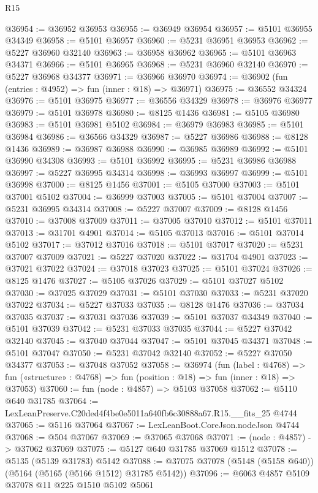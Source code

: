 \begin{lexlean}{R15}
\begin{coremodule}
{{{{{{{{{{{@36954 := @36952 @36953
@36955 := @36949 @36954
@36957 := @5101 @36955 @34349
@36958 := @5101 @36957
@36960 := @5231 @36951 @36953
@36962 := @5227 @36960 @32140
@36963 := @36958 @36962
@36965 := @5101 @36963 @34371
@36966 := @5101 @36965
@36968 := @5231 @36960 @32140
@36970 := @5227 @36968 @34377
@36971 := @36966 @36970
@36974 := @36902 (fun (entries : @4952) => fun (inner : @18) => @36971)
@36975 := @36552 @34324
@36976 := @5101 @36975
@36977 := @36556 @34329
@36978 := @36976 @36977
@36979 := @5101 @36978
@36980 := @8125 @1436
@36981 := @5105 @36980
@36983 := @5101 @36981 @5102
@36984 := @36979 @36983
@36985 := @5101 @36984
@36986 := @36566 @34329
@36987 := @5227 @36986
@36988 := @8128 @1436
@36989 := @36987 @36988
@36990 := @36985 @36989
@36992 := @5101 @36990 @34308
@36993 := @5101 @36992
@36995 := @5231 @36986 @36988
@36997 := @5227 @36995 @34314
@36998 := @36993 @36997
@36999 := @5101 @36998
@37000 := @8125 @1456
@37001 := @5105 @37000
@37003 := @5101 @37001 @5102
@37004 := @36999 @37003
@37005 := @5101 @37004
@37007 := @5231 @36995 @34314
@37008 := @5227 @37007
@37009 := @8128 @1456
@37010 := @37008 @37009
@37011 := @37005 @37010
@37012 := @5101 @37011
@37013 := @31701 @4901
@37014 := @5105 @37013
@37016 := @5101 @37014 @5102
@37017 := @37012 @37016
@37018 := @5101 @37017
@37020 := @5231 @37007 @37009
@37021 := @5227 @37020
@37022 := @31704 @4901
@37023 := @37021 @37022
@37024 := @37018 @37023
@37025 := @5101 @37024
@37026 := @8125 @1476
@37027 := @5105 @37026
@37029 := @5101 @37027 @5102
@37030 := @37025 @37029
@37031 := @5101 @37030
@37033 := @5231 @37020 @37022
@37034 := @5227 @37033
@37035 := @8128 @1476
@37036 := @37034 @37035
@37037 := @37031 @37036
@37039 := @5101 @37037 @34349
@37040 := @5101 @37039
@37042 := @5231 @37033 @37035
@37044 := @5227 @37042 @32140
@37045 := @37040 @37044
@37047 := @5101 @37045 @34371
@37048 := @5101 @37047
@37050 := @5231 @37042 @32140
@37052 := @5227 @37050 @34377
@37053 := @37048 @37052
@37058 := @36974
    (fun (label : @4768) =>
    fun («structure» : @4768) => fun (position : @18) => fun (inner : @18) => @37053)
@37060 := fun (node : @4857) => @5103 @37058
@37062 := @5110 @640 @31785
@37064 := LexLeanPreserve.C20ded4f4be0e5011a640fb6c30888a67.R15.__fits_25 @4744
@37065 := @5116 @37064
@37067 := LexLeanBoot.CoreJson.nodeJson @4744
@37068 := @504 @37067
@37069 := @37065 @37068
@37071 := (node : @4857) -> @37062 @37069
@37075 := @5127 @640 @31785 @37069 @1512
@37078 := @5135 (@5139 @31783) @5142
@37088 := @37075 @37078 (@5148 (@5158 @640)) (@5164 (@5165 (@5166 @1512) @31785 @5142))
@37096 := @6063 @4857 @5109 @37078 @11 @225 @1510 @5102 @5061
}}}}}}}}}}}
\end{coremodule}
\end{lexlean}
